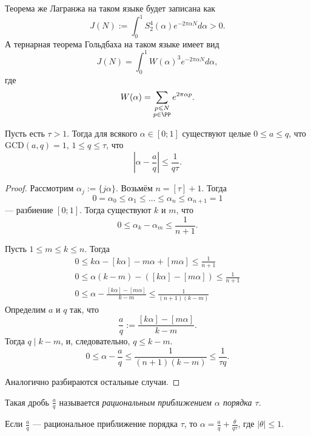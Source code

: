 \documentclass[12pt,a4paper]{article}
\newcommand{\GCD}{\mathrm{GCD}}
\begin{document}
    Теорема же Лагранжа на таком языке будет записана как
    \[J(N) := \int_0^1 S_2^4(\alpha) e^{-2\pi \alpha N} d\alpha > 0.\]
    А тернарная теорема Гольдбаха на таком языке имеет вид
    \[J(N) = \int_0^1 W(\alpha)^3 e^{-2\pi \alpha N} d\alpha,\]
    где
    \[W(\alpha) = \sum_{\substack{p \leqslant N\\ p \in \PP}} e^{2\pi \alpha p}.\]

    \begin{theorem}
        Пусть есть $\tau > 1$. Тогда для всякого $\alpha \in [0; 1]$ существуют целые $0 \leqslant a \leqslant q$, что $\GCD(a, q) = 1$, $1 \leqslant q \leqslant \tau$, что
        \[\left|\alpha - \frac{a}{q}\right|  \leqslant \frac{1}{q \tau}.\]
    \end{theorem}

    \begin{proof}
        Рассмотрим $\alpha_j := \{j\alpha\}$. Возьмём $n = [\tau] + 1$. Тогда
        \[0 = \alpha_0 \leqslant \alpha_1 \leqslant \dots \leqslant \alpha_n \leqslant \alpha_{n+1} = 1\]
        --- разбиение $[0; 1]$. Тогда существуют $k$ и $m$, что
        \[0 \leqslant \alpha_k - \alpha_m \leqslant \frac{1}{n+1}.\]

        Пусть $1 \leqslant m \leqslant k \leqslant n$. Тогда
        \begin{gather*}
            0 \leqslant k \alpha - [k \alpha] - m \alpha + [m \alpha] \leqslant \frac{1}{n+1}\\
            0 \leqslant \alpha(k-m) - ([k \alpha] - [m \alpha]) \leqslant \frac{1}{n+1}\\
            0 \leqslant \alpha - \frac{[k \alpha] - [m \alpha]}{k-m} \leqslant \frac{1}{(n+1)(k-m)}
        \end{gather*}
        Определим $a$ и $q$ так, что
        \[\frac{a}{q} := \frac{[k \alpha] - [m \alpha]}{k-m}.\]
        Тогда $q \mid k-m$, и, следовательно, $q \leqslant k-m$.
        \[0 \leqslant \alpha - \frac{a}{q} \leqslant \frac{1}{(n+1)(k-m)} \leqslant \frac{1}{\tau q}.\]

        Аналогично разбираются остальные случаи.
    \end{proof}

    \begin{remark}
        Такая дробь $\frac{a}{q}$ называется \emph{рациональным приближением
         $\alpha$ порядка $\tau$}.
    \end{remark}

    \begin{remark}
        Если $\frac{a}{q}$ --- рациональное приближение порядка $\tau$, то $\alpha = \frac{a}{q} + \frac{\theta}{q \tau}$, где $|\theta| \leqslant 1$.
    \end{remark}
\end{document}
